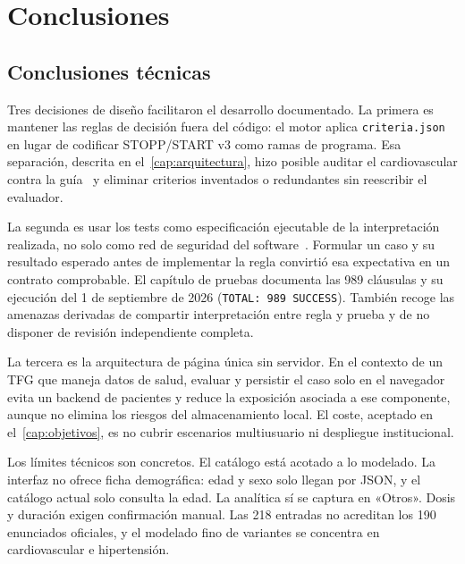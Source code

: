 
\chapter{Conclusiones}
\label{cap:conclusiones}

\section{Conclusiones técnicas}

Tres decisiones de diseño facilitaron el desarrollo documentado. La primera es
mantener las reglas de decisión fuera del código: el motor aplica
\texttt{criteria.json} en lugar de codificar STOPP/START v3 como
ramas de programa. Esa separación, descrita en
el~\cref{cap:arquitectura}, hizo posible auditar el cardiovascular
contra la guía~\cite{omahony2023stopp,sacyl2023stopp} y eliminar
criterios inventados o redundantes sin reescribir el evaluador.

La segunda es usar los tests como especificación ejecutable de la
interpretación realizada, no solo como red de seguridad del
software~\cite{beck2002tdd}. Formular un caso y su resultado esperado antes de
implementar la regla convirtió esa expectativa en un contrato comprobable. El
capítulo de pruebas documenta las 989 cláusulas y su ejecución del
1 de septiembre de 2026 (\texttt{TOTAL: 989 SUCCESS}). También recoge las
amenazas derivadas
de compartir interpretación entre regla y prueba y de no disponer de revisión
independiente completa.

La tercera es la arquitectura de página única sin servidor. En el
contexto de un TFG que maneja datos de salud, evaluar y persistir el
caso solo en el navegador evita un backend de pacientes y reduce la
exposición asociada a ese componente, aunque no elimina los riesgos del
almacenamiento local. El coste, aceptado en
el~\cref{cap:objetivos}, es no cubrir escenarios multiusuario ni
despliegue institucional.

Los límites técnicos son concretos. El catálogo está acotado a lo modelado.
La interfaz no ofrece ficha demográfica: edad y sexo solo llegan por JSON,
y el catálogo actual solo consulta la edad. La analítica sí se captura en
«Otros». Dosis y duración exigen confirmación manual. Las 218 entradas no
acreditan los 190 enunciados oficiales, y el modelado fino de variantes se
concentra en cardiovascular e hipertensión.

